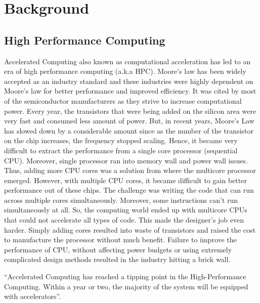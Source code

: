 
\newpage
\chapter{Background}

\section{High Performance Computing}

Accelerated Computing also known as computational acceleration has led to an era of high performance computing (a.k.a HPC). Moore's law has been widely accepted as an industry standard and these industries were highly dependent on Moore's law for better performance and improved efficiency. It was cited by most of the semiconductor manufacturers as they strive to increase computational power. Every year, the transistors that were being added on the silicon area were very fast and consumed less amount of power. But, in recent years, Moore's Law has slowed down by a considerable amount since as the number of the transistor on the chip increases, the frequency stopped scaling. Hence, it became very difficult to extract the performance from a single core processor (sequential CPU). Moreover, single processor ran into memory wall and power wall issues. Thus, adding more CPU cores was a solution from where the multicore processor emerged. However, with multiple CPU cores, it became difficult to gain better performance out of these chips. The challenge was writing the code that can run across multiple cores simultaneously. Moreover, some instructions can't run simultaneously at all. So, the computing world ended up with multicore CPUs that could not accelerate all types of code. This made the designer’s job even harder. Simply adding cores resulted into waste of transistors and raised the cost to manufacture the processor without much benefit. Failure to improve the performance of CPU, without affecting power budgets or using extremely complicated design methods resulted in the industry hitting a brick wall.

“Accelerated Computing has reached a tipping point in the High-Performance Computing. Within a year or two, the majority of the system will be equipped with accelerators”. \cite{2}

